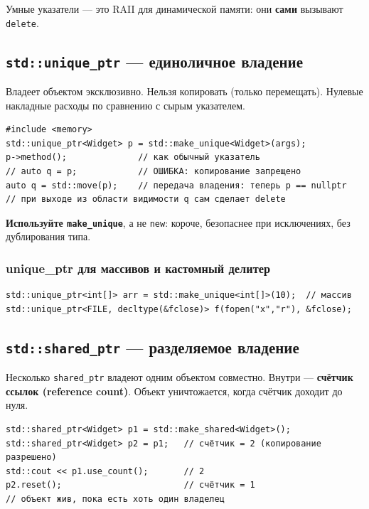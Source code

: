 Умные указатели --- это RAII для динамической памяти: они \textbf{сами} вызывают
\texttt{delete}.

\subsection{\texttt{std::unique\_ptr} --- единоличное владение}

Владеет объектом эксклюзивно. Нельзя копировать (только перемещать). Нулевые
накладные расходы по сравнению с сырым указателем.

\begin{lstlisting}
#include <memory>
std::unique_ptr<Widget> p = std::make_unique<Widget>(args);
p->method();              // как обычный указатель
// auto q = p;            // ОШИБКА: копирование запрещено
auto q = std::move(p);    // передача владения: теперь p == nullptr
// при выходе из области видимости q сам сделает delete
\end{lstlisting}

\textbf{Используйте \texttt{make\_unique}}, а не \texttt{new}: короче, безопаснее
при исключениях, без дублирования типа.

\subsubsection{unique\_ptr для массивов и кастомный делитер}

\begin{lstlisting}
std::unique_ptr<int[]> arr = std::make_unique<int[]>(10);  // массив
std::unique_ptr<FILE, decltype(&fclose)> f(fopen("x","r"), &fclose);
\end{lstlisting}

\subsection{\texttt{std::shared\_ptr} --- разделяемое владение}

Несколько \texttt{shared\_ptr} владеют одним объектом совместно. Внутри ---
\textbf{счётчик ссылок (reference count)}. Объект уничтожается, когда счётчик
доходит до нуля.

\begin{lstlisting}
std::shared_ptr<Widget> p1 = std::make_shared<Widget>();
std::shared_ptr<Widget> p2 = p1;   // счётчик = 2 (копирование разрешено)
std::cout << p1.use_count();       // 2
p2.reset();                        // счётчик = 1
// объект жив, пока есть хоть один владелец
\end{lstlisting}

